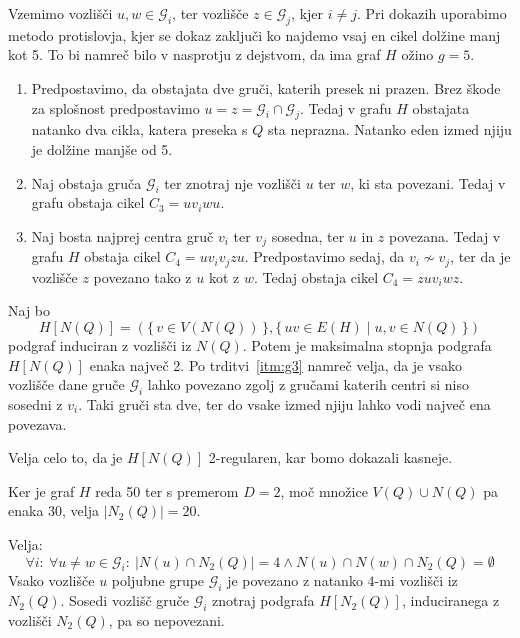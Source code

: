 \documentclass[fin1, tisk]{fmfdelo}
\newcommand{\gr}{\mathscr{G}}
\begin{document}
\begin{dokaz}
Vzemimo vozlišči $u, w \in \gr_i$, ter vozlišče $z \in \gr_j$, kjer $i \neq j$.
Pri dokazih uporabimo metodo protislovja, kjer se dokaz zaključi ko najdemo 
vsaj en cikel dolžine manj kot 5. To bi namreč bilo v nasprotju z dejstvom, 
da ima graf $H$ ožino $g=5$.
\begin{enumerate}[label=(\Roman*)]
\item Predpostavimo, da obstajata dve gruči, katerih presek ni prazen.
Brez škode za splošnost predpostavimo $u = z = \gr_i \cap \gr_j$.
Tedaj v grafu $H$ obstajata natanko dva cikla, katera preseka s $Q$ sta 
neprazna. Natanko eden izmed njiju je dolžine manjše od 5.
\item Naj obstaja gruča $\gr_i$ ter znotraj nje vozlišči $u$ ter $w$, ki sta povezani.
Tedaj v grafu obstaja cikel $C_3 = u v_i w u$.
\item Naj bosta najprej centra gruč $v_i$ ter $v_j$ sosedna, ter $u$ in $z$
povezana. Tedaj v grafu $H$ obstaja cikel $C_4 = u v_i v_j z u$.
Predpostavimo sedaj, da $v_i \not \sim v_j$, ter da je vozlišče $z$ povezano 
tako z $u$ kot z $w$. Tedaj obstaja cikel $C_4 = z u v_i w z$.
\end{enumerate}
\end{dokaz}

\begin{posledica}
Naj bo 
\[
H[N(Q)] = \left(\{\,v \in V(N(Q))\,\}, 
\{\,uv \in E(H) \mid u, v \in N(Q)\,\}\right)
\]
podgraf induciran z vozlišči iz $N(Q)$. Potem je maksimalna stopnja podgrafa \\$H[N(Q)]$
enaka največ 2. Po trditvi~\ref{itm:g3} namreč velja, da je vsako vozlišče dane 
gruče $\gr_i$ lahko povezano zgolj z gručami katerih centri si niso sosedni z $v_i$.
Taki gruči sta dve, ter do vsake izmed njiju lahko vodi največ ena povezava.

Velja celo to, da je $H[N(Q)]$ 2-regularen, kar bomo dokazali kasneje.
\end{posledica}

Ker je graf $H$ reda 50 ter s premerom $D=2$, 
moč množice $V(Q) \cup N(Q)$ pa enaka 30, velja $|N_2(Q)| = 20$.

\begin{trditev}
Velja:
\[
\forall i:\ \forall u \neq w \in \gr_i:\ |N(u) \cap N_2(Q)| = 4 \land N(u) \cap N(w) \cap N_2(Q) = \emptyset
\]
Vsako vozlišče $u$ poljubne grupe $\gr_i$ je povezano z natanko $4$-mi vozlišči 
iz $N_2(Q)$. Sosedi vozlišč gruče $\gr_i$ znotraj podgrafa $H[N_2(Q)]$,
induciranega z vozlišči $N_2(Q)$, pa so nepovezani.
\end{trditev}
\end{document}
